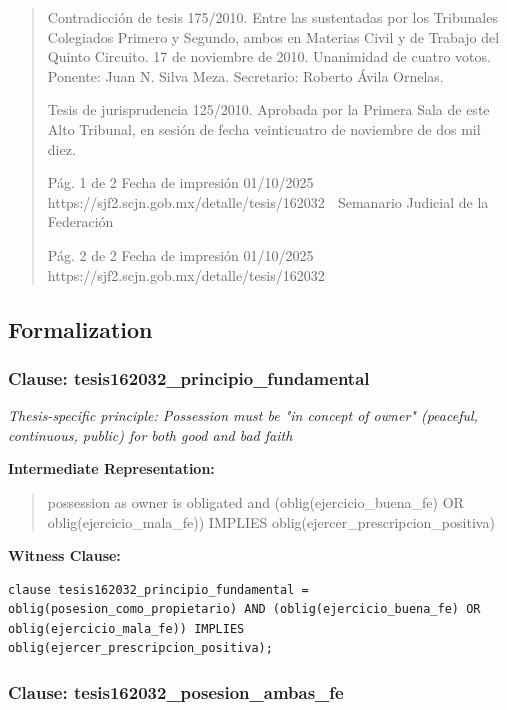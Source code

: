 \documentclass[11pt,a4paper]{article}
\begin{document}
\begin{quote}
Contradicción de tesis 175/2010. Entre las sustentadas por los Tribunales Colegiados Primero y
Segundo, ambos en Materias Civil y de Trabajo del Quinto Circuito. 17 de noviembre de 2010.
Unanimidad de cuatro votos. Ponente: Juan N. Silva Meza. Secretario: Roberto Ávila Ornelas.

Tesis de jurisprudencia 125/2010. Aprobada por la Primera Sala de este Alto Tribunal, en sesión de
fecha veinticuatro de noviembre de dos mil diez.




                                             Pág. 1 de 2            Fecha de impresión 01/10/2025
  https://sjf2.scjn.gob.mx/detalle/tesis/162032
                                                Semanario Judicial de la Federación




                                           Pág. 2 de 2       Fecha de impresión 01/10/2025
https://sjf2.scjn.gob.mx/detalle/tesis/162032

\end{quote}

\subsection{Formalization}

\subsubsection{Clause: tesis162032\_principio\_fundamental}

\textit{Thesis-specific principle: Possession must be "in concept of owner" (peaceful, continuous, public) for both good and bad faith}

\textbf{Intermediate Representation:}

\begin{quote}
possession as owner is obligated and (oblig(ejercicio\_buena\_fe) OR oblig(ejercicio\_mala\_fe)) IMPLIES oblig(ejercer\_prescripcion\_positiva)
\end{quote}

\textbf{Witness Clause:}

\begin{lstlisting}[style=witnessstyle, language=Witness]
clause tesis162032_principio_fundamental = oblig(posesion_como_propietario) AND (oblig(ejercicio_buena_fe) OR oblig(ejercicio_mala_fe)) IMPLIES oblig(ejercer_prescripcion_positiva);
\end{lstlisting}

\subsubsection{Clause: tesis162032\_posesion\_ambas\_fe}
\end{document}

